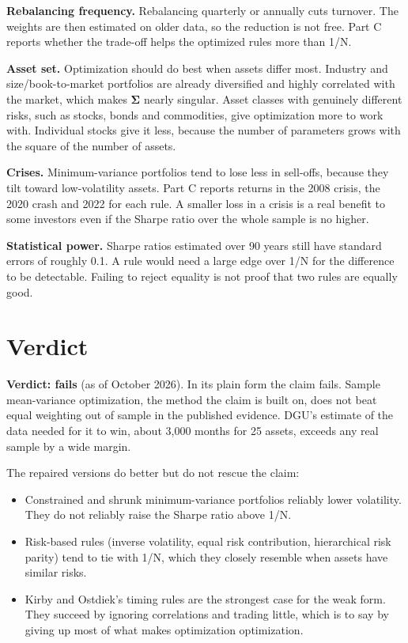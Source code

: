 \textbf{Rebalancing frequency.} Rebalancing quarterly or annually cuts turnover. The weights are then estimated on older data, so the reduction is not free. Part C reports whether the trade-off helps the optimized rules more than 1/N.

\textbf{Asset set.} Optimization should do best when assets differ most. Industry and size/book-to-market portfolios are already diversified and highly correlated with the market, which makes $\boldsymbol{\Sigma}$ nearly singular. Asset classes with genuinely different risks, such as stocks, bonds and commodities, give optimization more to work with. Individual stocks give it less, because the number of parameters grows with the square of the number of assets.

\textbf{Crises.} Minimum-variance portfolios tend to lose less in sell-offs, because they tilt toward low-volatility assets. Part C reports returns in the 2008 crisis, the 2020 crash and 2022 for each rule. A smaller loss in a crisis is a real benefit to some investors even if the Sharpe ratio over the whole sample is no higher.

\textbf{Statistical power.} Sharpe ratios estimated over 90 years still have standard errors of roughly 0.1. A rule would need a large edge over 1/N for the difference to be detectable. Failing to reject equality is not proof that two rules are equally good.

\section{Verdict}
\label{sec:19-verdict}

\begin{callout}
\textbf{Verdict: fails} (as of October 2026). In its plain form the claim fails. Sample mean-variance optimization, the method the claim is built on, does not beat equal weighting out of sample in the published evidence. DGU's estimate of the data needed for it to win, about 3,000 months for 25 assets, exceeds any real sample by a wide margin.
\end{callout}

The repaired versions do better but do not rescue the claim:

\begin{itemize}
  \item Constrained and shrunk minimum-variance portfolios reliably lower volatility. They do not reliably raise the Sharpe ratio above 1/N.
  \item Risk-based rules (inverse volatility, equal risk contribution, hierarchical risk parity) tend to tie with 1/N, which they closely resemble when assets have similar risks.
  \item Kirby and Ostdiek's timing rules are the strongest case for the weak form. They succeed by ignoring correlations and trading little, which is to say by giving up most of what makes optimization optimization.
\end{itemize}

